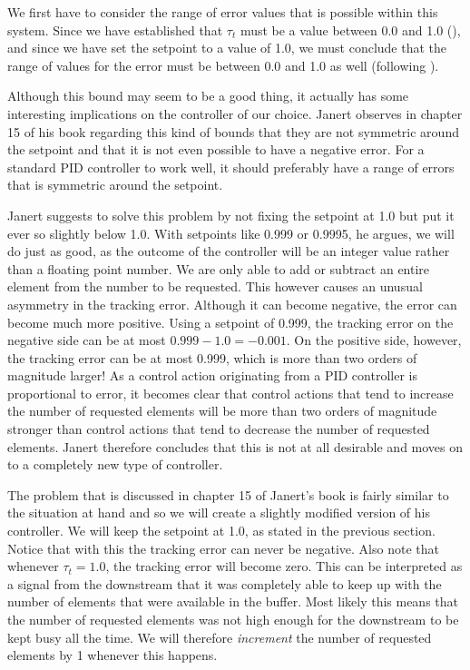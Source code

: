 We first have to consider the range of error values that is possible within this system. Since we have established that $\tau_t$ must be a value between 0.0 and 1.0 (), and since we have set the setpoint to a value of 1.0, we must conclude that the range of values for the error must be between 0.0 and 1.0 as well (following ). 

Although this bound may seem to be a good thing, it actually has some interesting implications on the controller of our choice. Janert observes in chapter 15 of his book \cite{janert2013-feedback} regarding this kind of bounds that they are not symmetric around the setpoint and that it is not even possible to have a negative error. For a standard PID controller to work well, it should preferably have a range of errors that is symmetric around the setpoint.

Janert suggests to solve this problem by not fixing the setpoint at 1.0 but put it ever so slightly below 1.0. With setpoints like 0.999 or 0.9995, he argues, we will do just as good, as the outcome of the controller will be an integer value rather than a floating point number. We are only able to add or subtract an entire element from the number to be requested. This however causes an unusual asymmetry in the tracking error. Although it can become negative, the error can become much more positive. Using a setpoint of 0.999, the tracking error on the negative side can be at most $0.999 - 1.0 = -0.001$. On the positive side, however, the tracking error can be at most 0.999, which is more than two orders of magnitude larger! As a control action originating from a PID controller is proportional to error, it becomes clear that control actions that tend to increase the number of requested elements will be more than two orders of magnitude stronger than control actions that tend to decrease the number of requested elements. Janert therefore concludes that this is not at all desirable and moves on to a completely new type of controller.

The problem that is discussed in chapter 15 of Janert's book is fairly similar to the situation at hand and so we will create a slightly modified version of his controller. We will keep the setpoint at 1.0, as stated in the previous section. Notice that with this the tracking error can never be negative. Also note that whenever $\tau_t = 1.0$, the tracking error will become zero. This can be interpreted as a signal from the downstream that it was completely able to keep up with the number of elements that were available in the buffer. Most likely this means that the number of requested elements was not high enough for the downstream to be kept busy all the time. We will therefore \textit{increment} the number of requested elements by 1 whenever this happens.

